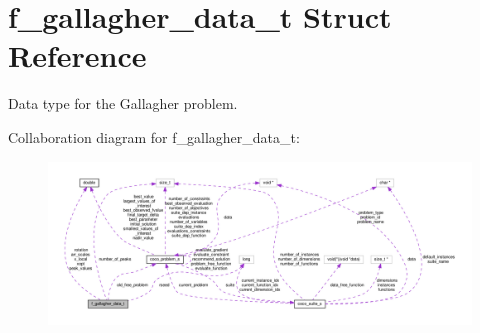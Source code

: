 \hypertarget{structf__gallagher__data__t}{}\section{f\+\_\+gallagher\+\_\+data\+\_\+t Struct Reference}
\label{structf__gallagher__data__t}


Data type for the Gallagher problem.  




Collaboration diagram for f\+\_\+gallagher\+\_\+data\+\_\+t\+:\nopagebreak
\begin{figure}[H]
\begin{center}
\leavevmode
\includegraphics[width=350pt]{structf__gallagher__data__t__coll__graph}
\end{center}
\end{figure}
